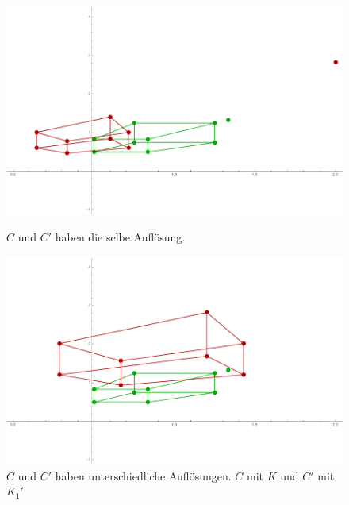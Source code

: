  
\begin{figure}[!htb]
	\includegraphics[width=\linewidth]{images/Zeta1.png}
	\caption[Abbildungen bei $K' = K$]{$C$ und $C'$ haben die selbe Auflösung.}
	\label{fig:K}
	\endminipage\hfill
	\includegraphics[width=\linewidth]{images/Zeta2.png}
	\caption[Abbildungen mit $K'_1$ und $K$]{$C$ und $C'$ haben unterschiedliche Auflösungen. $C$ mit $K$ und $C'$ mit $K_1'$}
	\label{fig:K1}
	\endminipage\hfill
\end{figure}

